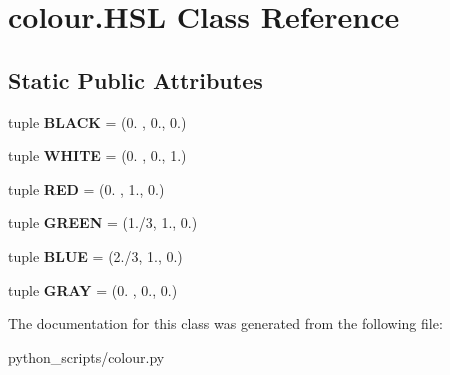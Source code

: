 \hypertarget{classcolour_1_1HSL}{}\section{colour.\+H\+S\+L Class Reference}
\label{classcolour_1_1HSL}
\subsection*{Static Public Attributes}
\begin{DoxyCompactItemize}
\item 
\hypertarget{classcolour_1_1HSL_a126535ecb96c65c30fe3e45a15047877}{}tuple {\bfseries B\+L\+A\+C\+K} = (0. , 0., 0.)\label{classcolour_1_1HSL_a126535ecb96c65c30fe3e45a15047877}

\item 
\hypertarget{classcolour_1_1HSL_a58cd85479743c70f8dc3655057b3dfda}{}tuple {\bfseries W\+H\+I\+T\+E} = (0. , 0., 1.)\label{classcolour_1_1HSL_a58cd85479743c70f8dc3655057b3dfda}

\item 
\hypertarget{classcolour_1_1HSL_aeeb08d5ae80e34d8e7dcbd4e8df43ace}{}tuple {\bfseries R\+E\+D} = (0. , 1., 0.)\label{classcolour_1_1HSL_aeeb08d5ae80e34d8e7dcbd4e8df43ace}

\item 
\hypertarget{classcolour_1_1HSL_af8bd1775a12264c0dc5d721fc9334575}{}tuple {\bfseries G\+R\+E\+E\+N} = (1./3, 1., 0.)\label{classcolour_1_1HSL_af8bd1775a12264c0dc5d721fc9334575}

\item 
\hypertarget{classcolour_1_1HSL_af331e70dfb1f8dd5679b71e33dfd2827}{}tuple {\bfseries B\+L\+U\+E} = (2./3, 1., 0.)\label{classcolour_1_1HSL_af331e70dfb1f8dd5679b71e33dfd2827}

\item 
\hypertarget{classcolour_1_1HSL_abe816fe43dce26a94ab583a1b4f4ea47}{}tuple {\bfseries G\+R\+A\+Y} = (0. , 0., 0.)\label{classcolour_1_1HSL_abe816fe43dce26a94ab583a1b4f4ea47}

\end{DoxyCompactItemize}


The documentation for this class was generated from the following file\+:\begin{DoxyCompactItemize}
\item 
python\+\_\+scripts/colour.\+py\end{DoxyCompactItemize}
